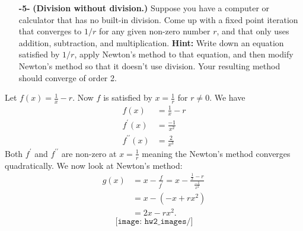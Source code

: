 \documentclass[11pt]{article}
\theoremstyle{definition}
\newcommand{\1}[1]{\mathbf{1} \left \{ #1 \right \}}
\begin{document}
\begin{itemize}
    \item[{\textbf{-5-}}] \textbf{(Division without division.)}  Suppose you have a computer or calculator that has no built-in division.  Come up with a fixed point iteration that converges to $1/r$ for any given non-zero number $r$, and that only uses addition, subtraction, and multiplication.  \textbf{Hint:}  Write down an equation satisfied by $1/r$, apply Newton's method to that equation, and then modify Newton's method so that it doesn't use division.  Your resulting method should converge of order 2.
\end{itemize}
Let \(f(x) = \frac{1}{x} - r\).  Now $f$ is satisfied by $x = \frac{1}{r}$ for $r \neq 0$.  We have
\begin{equation*}
    \begin{split}
        f(x) &= \frac{1}{x} - r \\
        f^{\prime}(x) &= \frac{-1}{x^2} \\
        f^{\prime\prime}(x) &= \frac{2}{x^3}
    \end{split}
\end{equation*}
Both $f^{\prime}$ and $f^{\prime\prime}$ are non-zero at $x = \frac{1}{r}$ meaning the Newton's method converges quadratically.  We now look at Newton's method:
\begin{equation*}
    \begin{split}
        g(x) &= x - \frac{f}{f^{\prime}} = x - \frac{\frac{1}{x} - r}{\frac{-1}{x^2}} \\
        &= x - (-x + rx^2) \\
        &= 2x - rx^2.
    \end{split}
\end{equation*}
\[\texttt{[image: hw2\_images/]}\]
\end{document}
